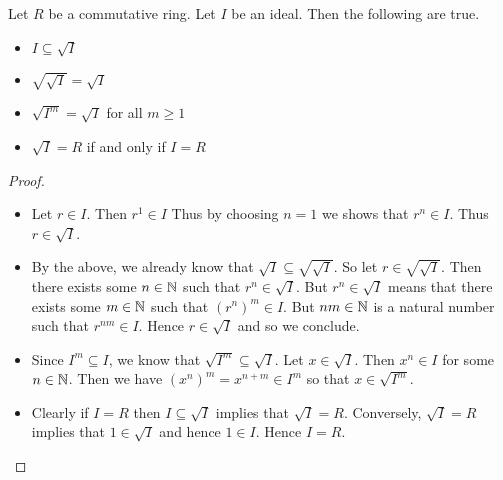 \documentclass[a4paper]{article}
\begin{document}
\begin{prp}{}{} Let $R$ be a commutative ring. Let $I$ be an ideal. Then the following are true. 
\begin{itemize}
\item $I\subseteq\sqrt{I}$
\item $\sqrt{\sqrt{I}}=\sqrt{I}$
\item $\sqrt{I^m}=\sqrt{I}$ for all $m\geq 1$
\item $\sqrt{I}=R$ if and only if $I=R$
\end{itemize} \tcbline
\begin{proof}~\\
\begin{itemize}
\item Let $r\in I$. Then $r^1\in I$ Thus by choosing $n=1$ we shows that $r^n\in I$. Thus $r\in\sqrt{I}$. 
\item By the above, we already know that $\sqrt{I}\subseteq\sqrt{\sqrt{I}}$. So let $r\in\sqrt{\sqrt{I}}$. Then there exists some $n\in\mathbb{N}$ such that $r^n\in\sqrt{I}$. But $r^n\in\sqrt{I}$ means that there exists some $m\in\mathbb{N}$ such that $(r^n)^m\in I$. But $nm\in\mathbb{N}$ is a natural number such that $r^{nm}\in I$. Hence $r\in\sqrt{I}$ and so we conclude. 
\item Since $I^m\subseteq I$, we know that $\sqrt{I^m}\subseteq\sqrt{I}$. Let $x\in\sqrt{I}$. Then $x^n\in I$ for some $n\in\mathbb{N}$. Then we have $(x^n)^m=x^{n+m}\in I^m$ so that $x\in\sqrt{I^m}$. 
\item Clearly if $I=R$ then $I\subseteq\sqrt{I}$ implies that $\sqrt{I}=R$. Conversely, $\sqrt{I}=R$ implies that $1\in\sqrt{I}$ and hence $1\in I$. Hence $I=R$. 
\end{itemize}
\end{proof}
\end{prp}
\end{document}
